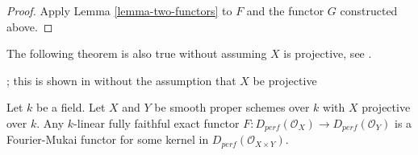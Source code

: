 \begin{proof}
Apply Lemma \ref{lemma-two-functors} to $F$ and the functor
$G$ constructed above.
\end{proof}

\noindent
The following theorem is also true without assuming $X$ is projective,
see \cite{Noah}.

\begin{theorem}[Orlov]
\label{theorem-fully-faithful}
\begin{reference}
\cite[Theorem 2.2]{Orlov-K3}; this is shown in \cite{Noah}
without the assumption that $X$ be projective
\end{reference}
Let $k$ be a field. Let $X$ and $Y$ be smooth proper schemes over $k$
with $X$ projective over $k$. Any $k$-linear fully faithful exact 
functor $F : D_{perf}(\mathcal{O}_X) \to D_{perf}(\mathcal{O}_Y)$
is a Fourier-Mukai functor for some kernel in
$D_{perf}(\mathcal{O}_{X \times Y})$.
\end{theorem}

